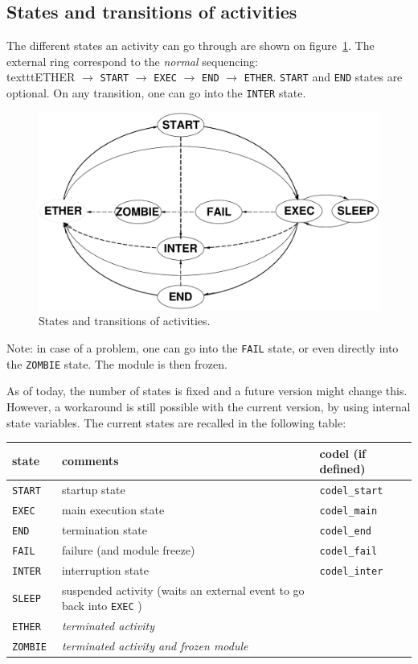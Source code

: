 \subsection{States and transitions of activities}

The   different  states   an  activity can   go   through  are  shown  on
figure~\ref{fig|states}. The external ring correspond to the \emph{normal}
sequencing: \\texttt{ETHER} $\rightarrow$   \texttt{START} $\rightarrow$   
\texttt{EXEC} $\rightarrow$ \texttt{END}  $\rightarrow$ \texttt{ETHER}. \texttt{START} and
\texttt{END}  states are optional.   On any transition, one  can go into the
\texttt{INTER} state.

\begin{figure}[htbp]
\centering
\includegraphics[width=0.8\hsize]{fig/activity-states}
\caption{States and transitions of activities.}
\label{fig|states}
\end{figure}

Note: in case of a problem, one can go into the \texttt{FAIL} state, or even
directly into the \texttt{ZOMBIE} state. The module is then frozen.

As of today, the  number of states is fixed  and  a future version  might
change this.  However, a workaround  is  still possible with the  current
version, by using internal   state   variables. The current  states   are
recalled in the following table:

\bigbreak

{\small\begin{tabularx}{0.8\linewidth}{|l||X|l|}
\hline
state 	& comments 	& codel (if defined)	  \\
\hline
\tt START  & startup state 
		& \tt codel\_start 	\\
\tt EXEC   & main execution state & \tt codel\_main  \\
\tt END    & termination state 	& \tt codel\_end \\
\tt FAIL   & failure (and module freeze) \em 
					& \tt codel\_fail \\
\hline
\tt INTER  & interruption state 
					& \tt codel\_inter  \\
\hline
\tt SLEEP     	&  suspended activity (waits an external event to go back
into  \texttt{EXEC} ) & \\
\tt ETHER    	& \em terminated activity  & \\
\tt ZOMBIE   	& \em terminated activity and frozen module & \\
\hline
\end{tabularx}}

